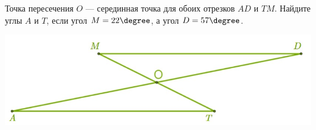 \begin{class}[number=5]
\begin{listofex}
\begin{minipage}[t]{0.45\textwidth}
			Точка пересечения \(O\) --- серединная точка для обоих отрезков \(AD\) и \(TM\). Найдите углы \(A\) и \(T\), если угол \(M = 22 \degree\), а угол \(D = 57 \degree\).
		\end{minipage}
		\begin{minipage}[c]{0.53\textwidth}
			\includegraphics[align=t, width=\textwidth]{pics/G71M4C5-2.jpg}
		\end{minipage}
	\end{listofex}
\end{class}
%
%
%
%	
%
%
